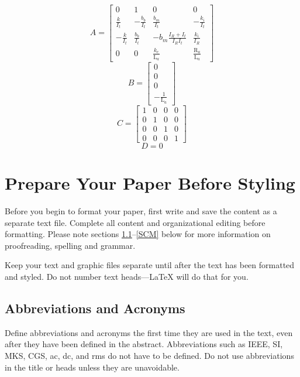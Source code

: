 \documentclass[conference]{IEEEtran}
\begin{document}
\begin{equation}
    A=\begin{bmatrix}
        0 & 1 & 0 & 0\\
        \frac{k}{I_t} & -\frac{b_b}{I_t} & \frac{b_m }{I_t}& -\frac{k_i}{I_t}\\
        -\frac{k}{I_t} & \frac{b_b}{I_t} & - b_m\frac{I_R+I_t}{I_RI_t} & \frac{k_i}{I_R}\\
        0 & 0 & \frac{k_e}{\text{L}_a} & \frac{\text{R}_a}{\text{L}_a}
    \end{bmatrix}
    \label{eq:matriz_A}
\end{equation}
\begin{equation}
    B=\begin{bmatrix}
        0 \\
        0 \\
        0 \\
        -\frac{1}{\text{L}_a}
    \end{bmatrix}
    \label{eq:matriz_B}   
\end{equation}
\begin{equation}
    C=\begin{bmatrix}
        1 & 0 & 0&0\\
        0 & 1 & 0&0 \\
        0 & 0 & 1 &0\\
        0 & 0 & 0 & 1
    \end{bmatrix}
    \label{eq:matriz_C}   
\end{equation}
\begin{equation}
   D = 0
    \label{eq:matriz_D}   
\end{equation}


\section{Prepare Your Paper Before Styling}
Before you begin to format your paper, first write and save the content as a 
separate text file. Complete all content and organizational editing before 
formatting. Please note sections \ref{AA}--\ref{SCM} below for more information on 
proofreading, spelling and grammar.

Keep your text and graphic files separate until after the text has been 
formatted and styled. Do not number text heads---{\LaTeX} will do that 
for you.

\subsection{Abbreviations and Acronyms}\label{AA}
Define abbreviations and acronyms the first time they are used in the text, 
even after they have been defined in the abstract. Abbreviations such as 
IEEE, SI, MKS, CGS, ac, dc, and rms do not have to be defined. Do not use 
abbreviations in the title or heads unless they are unavoidable.
\end{document}
